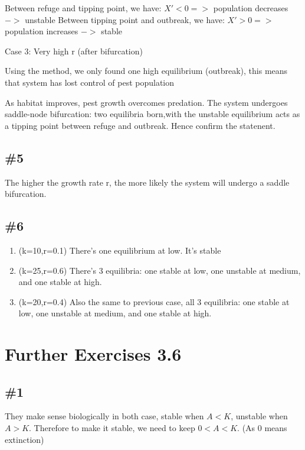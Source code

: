 \documentclass[12pt]{article}
\begin{document}
Between refuge and tipping point, we have:
$X' < 0 =>$ population decreases $->$ unstable
Between tipping point and outbreak, we have:
$X' > 0 =>$ population increases $->$ stable

Case 3: Very high r (after bifurcation)

Using the method, we only found one high equilibrium (outbreak), this means that system has lost control of pest population

As habitat improves, pest growth overcomes predation. The system undergoes saddle-node bifurcation: two equilibria born,with the unstable equilibrium acts as a tipping point between refuge and outbreak. Hence confirm the statenent.

\subsection*{\#5}
The higher the growth rate r, the more likely the system will undergo a saddle bifurcation.

\subsection*{\#6}
\begin{enumerate}[label=\alph*.]
    \item (k=10,r=0.1)
    There's one equilibrium at low. It's stable
    \item (k=25,r=0.6)
    There's 3 equilibria: one stable at low, one unstable at medium, and one stable at high. 
    \item (k=20,r=0.4)
    Also the same to previous case, all 3 equilibria: one stable at low, one unstable at medium, and one stable at high.
\end{enumerate}

\section*{Further Exercises 3.6}
\subsection*{\#1}
They make sense biologically in both case, stable when $A < K$, unstable when $A > K$. Therefore to make it stable, we need to keep $0 < A < K$. (As 0 means extinction)
\end{document}
